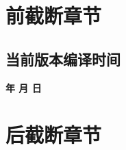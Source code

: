 \documentclass[doctor, vlined]{DissertUESTC}
\begin{document}
	\newcommand{\shad}[1]{\textcolor{DodgerBlue}{\ttfamily #1}}
	\newcommand{\shadcmd}[1]{\shad{$\backslash$#1}}

	
	\tableofcontents  %
	\listoffigures  %
	\listoftables  %
	\listofsymbs  %
	

	\chapter{前截断章节} %
	\section{当前版本编译时间}
	\noindent%
	\begin{center}%
		\bfseries\color{DarkRed}%
		\zhdigits*{\the\year} 年\zhnumber{\the\month} 月\zhnumber{\the\day} 日\;\xxivtime
	\end{center}

	
	
	
	
	

	\chapter{后截断章节} %

	\acknowledgement

	

	
\end{document}
